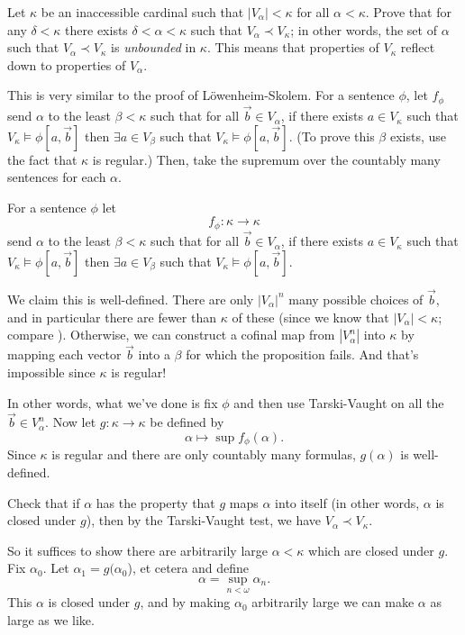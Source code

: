 \begin{dproblem}[Reflection]
	\onechili
	Let $\kappa$ be an inaccessible cardinal such that $|V_\alpha| < \kappa$ for all $\alpha < \kappa$.
	Prove that for any $\delta < \kappa$ there exists $\delta < \alpha < \kappa$
	such that $V_\alpha \prec V_\kappa$; in other words,
	the set of $\alpha$ such that $V_\alpha \prec V_\kappa$ is \emph{unbounded} in $\kappa$.
	This means that properties of $V_\kappa$ reflect down to properties of $V_\alpha$.
	\begin{hint}
		This is very similar to the proof of L\"owenheim-Skolem.
		For a sentence $\phi$, let $f_\phi$
		send $\alpha$ to the least $\beta < \kappa$ such that for all $\vec b \in V_\alpha$, if there exists $a \in V_\kappa$ such that $V_\kappa \vDash \phi[a, \vec b]$ then $\exists a \in V_\beta$ such that $V_\kappa \vDash \phi[a, \vec b]$.
		(To prove this $\beta$ exists, use the fact that $\kappa$ is regular.)
		Then, take the supremum over the countably many sentences for each $\alpha$.
	\end{hint}
	\begin{sol}
		For a sentence $\phi$ let \[ f_\phi \colon \kappa \to \kappa \]
		send $\alpha$ to the least $\beta < \kappa$ such that for all $\vec b \in V_\alpha$, if there exists $a \in V_\kappa$ such that $V_\kappa \vDash \phi[a, \vec b]$ then $\exists a \in V_\beta$ such that $V_\kappa \vDash \phi[a, \vec b]$.

		We claim this is well-defined.
		There are only $\left\lvert V_\alpha \right\rvert^n$ many possible choices of $\vec b$,
		and in particular there are fewer than $\kappa$ of these
		(since we know that $\left\lvert V_\alpha \right\rvert < \kappa$; compare ).
		Otherwise, we can construct a cofinal map from $\left\lvert V_\alpha^n \right\rvert$
		into $\kappa$ by mapping each vector $\vec b$ into a $\beta$ for which the proposition fails.
		And that's impossible since $\kappa$ is regular!

		In other words, what we've done is fix $\phi$ and then use Tarski-Vaught on all the $\vec b \in V_\alpha^n$.
		Now let $g \colon \kappa \to \kappa$ be defined by
		\[ \alpha \mapsto \sup f_\phi(\alpha). \]
		Since $\kappa$ is regular and there are only countably many formulas, $g(\alpha)$ is well-defined.

		Check that if $\alpha$ has the property that $g$ maps $\alpha$ into itself (in other words, $\alpha$ is closed under $g$), then by the Tarski-Vaught test, we have $V_\alpha \prec V_\kappa$.

		So it suffices to show there are arbitrarily large $\alpha < \kappa$ which are closed under $g$.
		Fix $\alpha_0$. Let $\alpha_1 = g(\alpha_0$), et cetera and define
		\[ \alpha = \sup_{n < \omega} \alpha_n. \]
		This $\alpha$ is closed under $g$, and by making $\alpha_0$ arbitrarily large we can make $\alpha$ as large as we like.
	\end{sol}
\end{dproblem}


